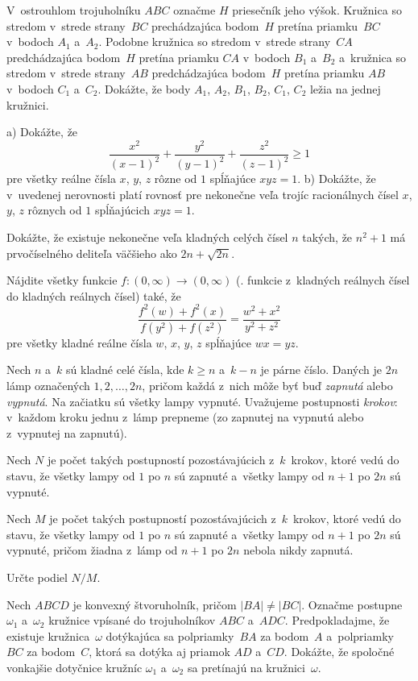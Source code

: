 {%
V~ostrouhlom trojuholníku $ABC$ označme $H$ priesečník jeho výšok. Kružnica so stredom v~strede strany~$BC$ prechádzajúca bodom~$H$ pretína priamku~$BC$ v~bodoch $A_1$ a~$A_2$. Podobne kružnica so stredom v~strede strany~$CA$ predchádzajúca bodom~$H$ pretína priamku $CA$ v~bodoch $B_1$ a~$B_2$ a~kružnica so stredom v~strede strany~$AB$ predchádzajúca bodom~$H$ pretína priamku $AB$ v~bodoch $C_1$ a~$C_2$. Dokážte, že body $A_1$, $A_2$, $B_1$, $B_2$, $C_1$, $C_2$ ležia na jednej kružnici.}

{%
\ite a) Dokážte, že
$$
\frac{x^2}{(x-1)^2} + \frac{y^2}{(y-1)^2} + \frac{z^2}{(z-1)^2} \ge 1
$$
pre všetky reálne čísla $x$, $y$, $z$ rôzne od $1$ spĺňajúce $xyz = 1$.
\ite b) Dokážte, že v~uvedenej nerovnosti platí rovnosť pre nekonečne veľa trojíc racionálnych čísel $x$, $y$, $z$ rôznych od $1$ spĺňajúcich $xyz = 1$.}

{%
Dokážte, že existuje nekonečne veľa kladných celých čísel $n$ takých, že $n^2+1$ má prvočíselného deliteľa väčšieho ako $2n+\sqrt{2n}$.}

{%
Nájdite všetky funkcie $f\colon(0,\infty) \to (0,\infty)$ (\tj. funkcie z~kladných reálnych čísel do kladných reálnych čísel) také, že
$$
\frac{f^2(w)+f^2(x)}{f(y^2)+f(z^2)} = \frac{w^2 + x^2}{y^2 + z^2}
$$
pre všetky kladné reálne čísla $w$, $x$, $y$, $z$ spĺňajúce $wx=yz$.}

{%
Nech $n$ a~$k$ sú kladné celé čísla, kde $k\ge n$ a~$k-n$ je párne číslo. Daných je $2n$ lámp označených $1,2,\dots,2n$, pričom každá z~nich môže byť buď {\it zapnutá\/} alebo {\it vypnutá}. Na začiatku sú všetky lampy vypnuté. Uvažujeme postupnosti {\it krokov\/}: v~každom kroku jednu z~lámp prepneme (zo zapnutej na vypnutú alebo z~vypnutej na zapnutú).

Nech $N$ je počet takých postupností pozostávajúcich z~$k$~krokov, ktoré vedú do stavu, že všetky lampy od $1$ po $n$ sú zapnuté a~všetky lampy od $n+1$ po $2n$ sú vypnuté.

Nech $M$ je počet takých postupností pozostávajúcich z~$k$~krokov, ktoré vedú do stavu, že všetky lampy od $1$ po $n$ sú zapnuté a~všetky lampy od $n+1$ po $2n$ sú vypnuté, pričom žiadna z~lámp od $n+1$ po $2n$ nebola nikdy zapnutá.

Určte podiel $N/M$.}

{%
Nech $ABCD$ je konvexný štvoruholník, pričom $|BA|\ne|BC|$. Označme postupne $\omega_1$ a~$\omega_2$ kružnice vpísané do trojuholníkov $ABC$ a~$ADC$. Predpokladajme, že existuje kružnica~$\omega$ dotýkajúca sa polpriamky~$BA$ za bodom~$A$ a~polpriamky~$BC$ za bodom~$C$, ktorá sa dotýka aj priamok $AD$ a~$CD$. Dokážte, že spoločné vonkajšie dotyčnice kružníc $\omega_1$ a~$\omega_2$ sa pretínajú na kružnici~$\omega$.}

